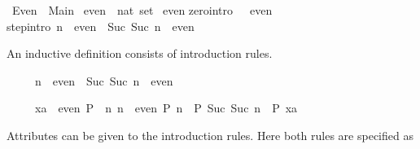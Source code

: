 %
\begin{isabellebody}%
\def\isabellecontext{Even}%
\isanewline
{}\ Even\ {\isacharequal}\ Main{\isacharcolon}\isanewline
\isanewline
\isanewline
\isamarkupfalse%
\ even\ {\isacharcolon}{\isacharcolon}\ {\isachardoublequote}nat\ set{\isachardoublequote}\isanewline
\isamarkupfalse%
\ even\isanewline
{}\isanewline
zero{\isacharbrackleft}intro{\isacharbang}{\isacharbrackright}{\isacharcolon}\ {\isachardoublequote}{}\ {\isasymin}\ even{\isachardoublequote}\isanewline
step{\isacharbrackleft}intro{\isacharbang}{\isacharbrackright}{\isacharcolon}\ {\isachardoublequote}n\ {\isasymin}\ even\ {\isasymLongrightarrow}\ {\isacharparenleft}Suc\ {\isacharparenleft}Suc\ n{\isacharparenright}{\isacharparenright}\ {\isasymin}\ even{\isachardoublequote}\isamarkupfalse%
%
\begin{isamarkuptext}%
An inductive definition consists of introduction rules. 

\begin{isabelle}%
\ \ \ \ \ n\ {\isasymin}\ even\ {\isasymLongrightarrow}\ Suc\ {\isacharparenleft}Suc\ n{\isacharparenright}\ {\isasymin}\ even%
\end{isabelle}

\begin{isabelle}%
\ \ \ \ \ {\isasymlbrakk}xa\ {\isasymin}\ even{\isacharsemicolon}\ P\ {}{\isacharsemicolon}\ {\isasymAnd}n{\isachardot}\ {\isasymlbrakk}n\ {\isasymin}\ even{\isacharsemicolon}\ P\ n{\isasymrbrakk}\ {\isasymLongrightarrow}\ P\ {\isacharparenleft}Suc\ {\isacharparenleft}Suc\ n{\isacharparenright}{\isacharparenright}{\isasymrbrakk}\ {\isasymLongrightarrow}\ P\ xa%
\end{isabelle}

Attributes can be given to the introduction rules.  Here both rules are
specified as 


\end{isamarkuptext}
\end{isabellebody}
